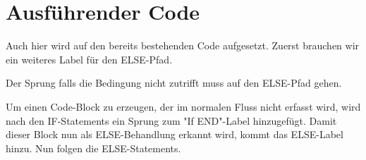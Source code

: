 \section{Ausführender Code}
Auch hier wird auf den bereits bestehenden Code aufgesetzt.
Zuerst brauchen wir ein weiteres Label für den ELSE-Pfad.

Der Sprung falls die Bedingung nicht zutrifft muss auf den ELSE-Pfad gehen.

Um einen Code-Block zu erzeugen, der im normalen Fluss nicht erfasst wird, wird nach den IF-Statements ein Sprung zum "If END"-Label hinzugefügt. Damit dieser Block nun als ELSE-Behandlung erkannt wird, kommt das ELSE-Label hinzu.
Nun folgen die ELSE-Statements.
